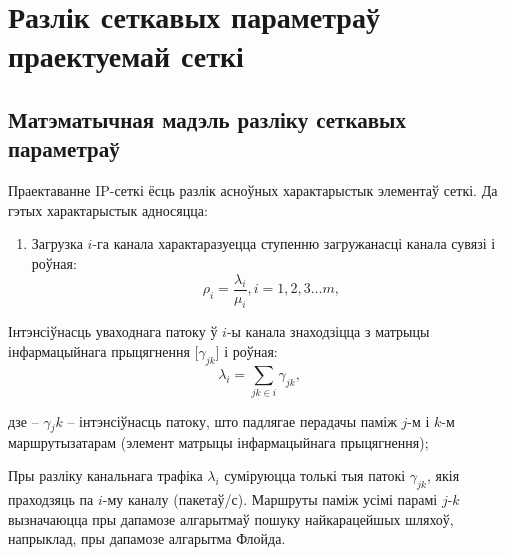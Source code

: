 \section{Разлік сеткавых параметраў праектуемай сеткі}

\subsection{Матэматычная мадэль разліку сеткавых параметраў}

Праектаванне IP-сеткі ёсць разлік асноўных характарыстык элементаў сеткі.
Да гэтых характарыстык адносяцца:
\begin{enumerate}
    \item Загрузка $i$-га канала характаразуецца ступенню загружанасці
          канала сувязі і роўная:
          \begin{equation}
              \rho_i = \frac{\lambda_i}{\mu_i}, i = 1,2,3 \ldots m,
          \end{equation}
\end{enumerate}

Інтэнсіўнасць уваходнага патоку ў $i$-ы канала знаходзіцца з
матрыцы інфармацыйнага прыцягнення [$\gamma_{jk}$] і роўная:
\begin{equation}
    \lambda_i = \sum_{jk \in i} \gamma_{jk},
\end{equation}
\begin{Explanation}
    \item[дзе] -- $\gamma{_jk}$ -- інтэнсіўнасць патоку, што
               падлягае перадачы паміж $j$-м і $k$-м маршрутызатарам
               (элемент матрыцы інфармацыйнага прыцягнення);
\end{Explanation}

Пры разліку канальнага трафіка $\lambda_i$ суміруюцца толькі тыя патокі
$\gamma_{jk}$, якія праходзяць па $i$-му каналу (пакетаў/с).
Маршруты паміж усімі парамі $j$-$k$ вызначаюцца пры дапамозе
алгарытмаў пошуку найкарацейшых шляхоў, напрыклад, пры дапамозе
алгарытма Флойда.

